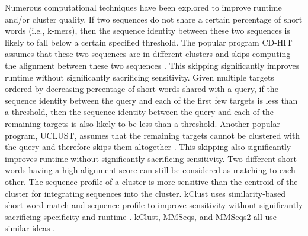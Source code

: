 \documentclass{bioinfo}
\begin{document}
Numerous computational techniques have been explored to improve runtime and/or cluster quality.
If two sequences do not share a certain percentage of short words (i.e., k-mers), then the sequence identity between these two sequences is likely to fall below a certain specified threshold.
The popular program CD-HIT assumes that these two sequences are in different clusters and skips computing the alignment between these two sequences \citep{li2002tolerating}.
This skipping significantly improves runtime without significantly sacrificing sensitivity.
Given multiple targets ordered by decreasing percentage of short words shared with a query, if the sequence identity between the query and each of the first few targets is less than a threshold, then the sequence identity between the query and each of the remaining targets is also likely to be less than a threshold.
Another popular program, UCLUST, assumes that the remaining targets cannot be clustered with the query and therefore skips them altogether \citep{edgar2010search}.
This skipping also significantly improves runtime without significantly sacrificing sensitivity.
Two different short words having a high alignment score can still be considered as matching to each other.
The sequence profile of a cluster is more sensitive than the centroid of the cluster for integrating sequences into the cluster.
kClust uses similarity-based short-word match and sequence profile to improve sensitivity without significantly sacrificing specificity and runtime \citep{hauser2013kclust}.
kClust, MMSeqs, and MMSeqs2 all use similar ideas \citep{hauser2013kclust,hauser2016mmseqs,steinegger2017mmseqs2}.
\end{document}

